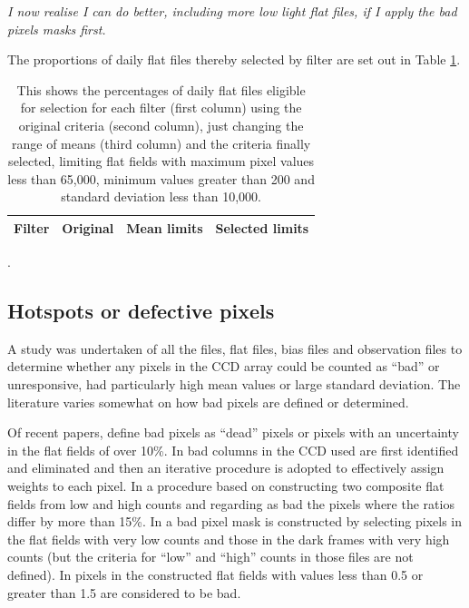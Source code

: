 \textit{I now realise I can do better, including more low light flat files, if
I apply the bad pixels masks first.}

The proportions of daily flat files thereby selected by filter are set out in
Table \ref{table:selectedflats}.

\begin{table}[!htbp]
\begin{center}
\begin{tabular}{lrrr} \hline
Filter & Original & Mean limits & Selected limits\\\hline

\hline
\end{tabular}
\end{center}
\caption{This shows the percentages of daily flat files eligible for selection
for each filter (first column) using the original criteria (second column),
just changing the range of means (third column) and the criteria finally
selected, limiting flat fields with maximum pixel values less than 65,000,
minimum values greater than 200 and standard deviation less than 10,000.}.
\protect\label{table:selectedflats}
\end{table}
\clearpage

\subsection{Hotspots or defective pixels}
\protect\label{section:hotspots}

A study was undertaken of all the files, flat files, bias files and observation
files to determine whether any pixels in the CCD array could be counted as
``bad'' or unresponsive, had particularly high mean values or large standard
deviation. The literature varies somewhat on how bad pixels are defined or
determined.

Of recent papers, \citet{allers20} define bad pixels as ``dead'' pixels or pixels
with an uncertainty in the flat fields of over 10\%. In \citet{piskunov20} bad
columns in the CCD used are first identified and eliminated and then an
iterative procedure is adopted to effectively assign weights to each pixel. In
\citet{bongiovanni19} a procedure based on constructing two composite flat
fields from low and high counts and regarding as bad the pixels where the ratios
differ by more than 15\%. In \citet{belli18} a bad pixel mask is constructed by
selecting pixels in the flat fields with very low counts and those in the dark
frames with very high counts (but the criteria for ``low'' and ``high'' counts
in those files are not defined). In \citet{briesemeister18} pixels in the
constructed flat fields with values less than 0.5 or greater than 1.5 are
considered to be bad.

